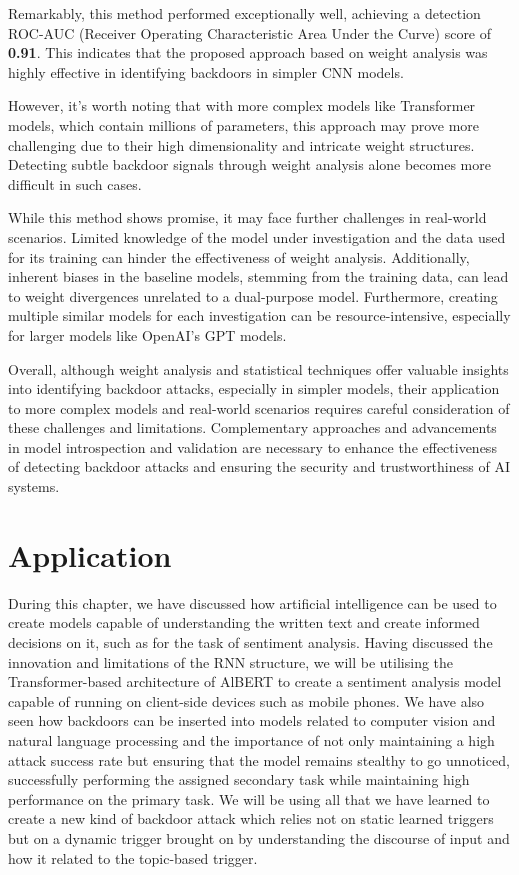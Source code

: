 Remarkably, this method performed exceptionally well, achieving a detection ROC-AUC (Receiver Operating Characteristic Area Under the Curve) score of \textbf{0.91}. This indicates that the proposed approach based on weight analysis was highly effective in identifying backdoors in simpler CNN models.

However, it's worth noting that with more complex models like Transformer models, which contain millions of parameters, this approach may prove more challenging due to their high dimensionality and intricate weight structures. Detecting subtle backdoor signals through weight analysis alone becomes more difficult in such cases.

While this method shows promise, it may face further challenges in real-world scenarios. Limited knowledge of the model under investigation and the data used for its training can hinder the effectiveness of weight analysis. Additionally, inherent biases in the baseline models, stemming from the training data, can lead to weight divergences unrelated to a dual-purpose model. Furthermore, creating multiple similar models for each investigation can be resource-intensive, especially for larger models like OpenAI's GPT models.

Overall, although weight analysis and statistical techniques offer valuable insights into identifying backdoor attacks, especially in simpler models, their application to more complex models and real-world scenarios requires careful consideration of these challenges and limitations. Complementary approaches and advancements in model introspection and validation are necessary to enhance the effectiveness of detecting backdoor attacks and ensuring the security and trustworthiness of AI systems.

\section{Application}

During this chapter, we have discussed how artificial intelligence can be used to create models capable of understanding the written text and create informed decisions on it, such as for the task of sentiment analysis. Having discussed the innovation and limitations of the RNN structure, we will be utilising the Transformer-based architecture of AlBERT to create a sentiment analysis model capable of running on client-side devices such as mobile phones. We have also seen how backdoors can be inserted into models related to computer vision and natural language processing and the importance of not only maintaining a high attack success rate but ensuring that the model remains stealthy to go unnoticed, successfully performing the assigned secondary task while maintaining high performance on the primary task. We will be using all that we have learned to create a new kind of backdoor attack which relies not on static learned triggers but on a dynamic trigger brought on by understanding the discourse of input and how it related to the topic-based trigger.
